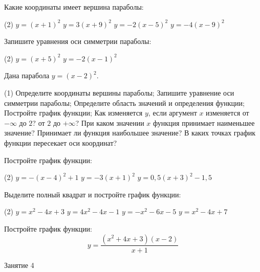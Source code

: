 \begin{class}[number=3]
	\begin{listofex}
		\item Какие координаты имеет вершина параболы:
		\begin{tasks}(2)
			\task \( y=(x+1)^2 \)
			\task \( y=3(x+9)^2 \)
			\task \( y=-2(x-5)^2 \)
			\task \( y=-4(x-9)^2 \)
		\end{tasks}
		\item Запишите уравнения оси симметрии параболы:
		\begin{tasks}(2)
			\task \( y=(x+5)^2 \)
			\task \( y=-2(x-1)^2 \)
		\end{tasks}
		\item Дана парабола \( y=(x-2)^2 \). 
		\begin{tasks}(1)
			\task Определите координаты вершины параболы;
			\task Запишите уравнение оси симметрии параболы;
			\task Определите область значений и определения функции;
			\task Постройте график функции;
			\task Как изменяется \( y \), если аргумент \( x \) изменяется от \( -\infty  \) до \( 2 \)? от \( 2 \) до \( +\infty \)?
			\task При каком значении \( x \) функция принимает наименьшее значение? Принимает ли функция наибольшее значение?
			\task В каких точках график функции пересекает оси координат?
		\end{tasks} 
		\item Постройте график функции:
		\begin{tasks}(2)
			\task \( y=-(x-4)^2+1 \)
			\task \( y=-3(x+1)^2 \)
			\task \( y=0,5(x+3)^2-1,5 \)
		\end{tasks}
		\item Выделите полный квадрат и постройте график функции:
		\begin{tasks}(2)
			\task \( y=x^2-4x+3 \)
			\task \( y=4x^2-4x-1 \)
			\task \( y=-x^2-6x-5 \)
			\task \( y=x^2-4x+7 \)
		\end{tasks}
		\item Постройте график функции: 
		\[y=\dfrac{(x^2+4x+3)(x-2)}{x+1}\]
	\end{listofex}
\end{class}

\begin{class}[number=4]
	\begin{listofex}
		\item Занятие 4
	\end{listofex}
\end{class}


